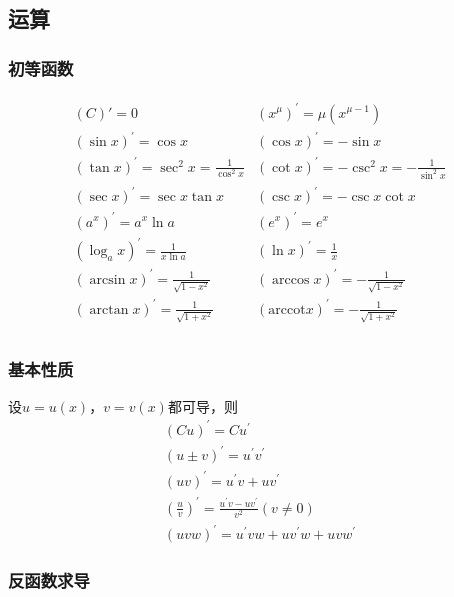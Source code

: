 \documentclass[12pt]{book}
\begin{document}
\subsection{运算}



\subsubsection{初等函数}
\begin{gather*}
    \begin{matrix} 
        (C)'=0 & (x^\mu)^\prime = \mu (x^{\mu-1}) \\
        (\sin{x})^\prime=\cos{x} & (\cos{x})^\prime=-\sin{x}  \\
        (\tan{x})^\prime=\sec^2{x}=\frac{1}{\cos^2{x}}  & (\cot{x})^\prime=-\csc^2{x}=-\frac{1}{\sin^2{x}}  \\
        (\sec{x})^\prime=\sec{x}\tan{x} & (\csc{x})^\prime=-\csc{x}\cot{x}  \\ 
        (a^x)^\prime = a^x \ln{a} & (e^x)^\prime=e^x  \\
        (\log_{a}{x})^\prime=\frac{1}{x\ln{a}} & (\ln{x})^\prime=\frac{1}{x}  \\ 
        (\arcsin{x})^\prime=\frac{1}{\sqrt{1-x^2}} & (\arccos{x})^\prime=-\frac{1}{\sqrt{1-x^2}}  \\
        (\arctan{x})^\prime=\frac{1}{\sqrt{1+x^2}} & (\mathrm{arccot}{x})^\prime=-\frac{1}{\sqrt{1+x^2}}   \\ 
        \end{matrix}    
\end{gather*}
 

\subsubsection{基本性质}

设$u=u(x) $，$v=v(x)$都可导，则
\begin{gather*}
    (Cu)^\prime=Cu^\prime \\
    (u\pm v)^\prime=u^\prime v^\prime \\
    (uv)^\prime=u^\prime v+uv^\prime \\
    \left(\frac{u}{v}\right)^\prime=\frac{u^\prime v-uv^\prime}{v^2} (v\ne 0)\\
    (uvw)^\prime =u^\prime vw+uv^\prime w+uvw^\prime
\end{gather*}


\subsubsection{反函数求导}
\end{document}
